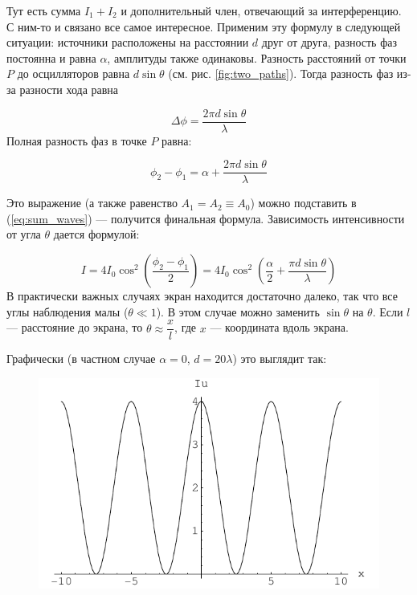 \documentclass[11pt,a4paper]{article}
\numberwithin{equation}{section}
\begin{document}
Тут есть сумма $I_1 + I_2$ и дополнительный член, отвечающий за
интерференцию. С ним-то и связано все самое интересное. Применим эту
формулу в следующей ситуации: источники расположены на расстоянии $d$
друг от друга, разность фаз постоянна и равна $\alpha$, амплитуды
также одинаковы. Разность расстояний от точки $P$ до осцилляторов
равна $d\sin \theta$ (см. рис. \ref{fig:two_paths}). Тогда разность фаз
из-за разности хода равна

\begin{equation}
\Delta \phi = \frac{2\pi d \sin \theta}{\lambda}
\end{equation}
Полная разность фаз в точке $P$ равна:

\begin{equation}
\phi_2 - \phi_1 = \alpha + \frac{2\pi d \sin \theta}{\lambda}
\end{equation}

Это выражение (а также равенство $A_1 = A_2 \equiv A_0$) можно подставить в (\ref{eq:sum_waves}) --- получится финальная формула. Зависимость интенсивности от угла $\theta$ дается формулой:

\begin{equation}
I = 4I_0 \cos^2 \left( \frac{\phi_2 - \phi_1}{2} \right) = 4I_0 \cos^2 \left( \frac{\alpha}{2} + \frac{\pi d \sin \theta}{\lambda} \right) 
\end{equation}
В практически важных случаях экран находится достаточно далеко, так что все углы наблюдения малы ($\theta \ll 1$). В этом случае можно заменить $\sin \theta$ на $\theta$. Если $l$ --- расстояние до экрана, то $\theta \approx \dfrac{x}{l}$, где $x$ --- координата вдоль экрана.

Графически (в частном случае $\alpha = 0$, $d = 20 \lambda $) это выглядит так: 

\begin{figure}[h]
  \centering
  \includegraphics[scale=1]{interference_plot.pdf}
\end{figure}
\end{document}
